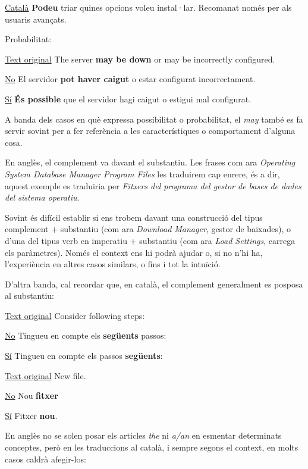 \documentclass[9pt]{cheatsheet}
\begin{document}
\begin{multicols*}{3}
\underline {Català} \textbf{Podeu} triar quines opcions voleu instal·lar. Recomanat només per als usuaris avançats.

Probabilitat:

\underline {Text original} The server \textbf{may be down} or may be incorrectly configured.

\underline {No} El servidor \textbf{pot haver caigut} o estar configurat incorrectament.

\underline {Sí} \textbf{És possible} que el servidor hagi caigut o estigui mal configurat.

A banda dels casos en què expressa possibilitat o probabilitat, el \emph{may} també es fa servir sovint per a fer referència a les característiques o comportament d'alguna cosa.


En anglès, el complement va davant el substantiu. Les frases com ara \emph{Operating System Database Manager Program Files} les traduirem cap enrere, és a dir, aquest exemple es traduiria per \emph{Fitxers del programa del gestor de bases de dades del sistema operatiu}.

Sovint és difícil establir si ens trobem davant una construcció del tipus complement + substantiu (com ara \emph{Download Manager}, gestor de baixades), o d'una del tipus verb en imperatiu + substantiu (com ara \emph{Load Settings}, carrega els paràmetres). Només el context ens hi podrà ajudar o, si no n'hi ha, l'experiència en altres casos similars, o fins i tot la intuïció.

D'altra banda, cal recordar que, en català, el complement generalment es posposa al substantiu:

\underline {Text original} Consider following steps:

\underline {No} Tingueu en compte els \textbf{següents} passos:

\underline {Sí} Tingueu en compte els passos \textbf{següents}:


\underline {Text original} New file.

\underline {No} Nou \textbf{fitxer}

\underline {Sí} Fitxer \textbf{nou}.


En anglès no se solen posar els articles \emph{the} ni \emph{a/an} en esmentar determinats conceptes, però en les traduccions al català, i sempre segons el context, en molts casos caldrà afegir-los:


\end{multicols*}
\end{document}
